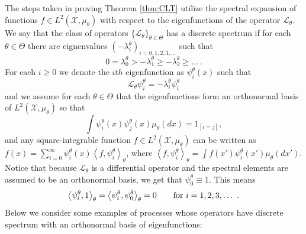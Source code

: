 \documentclass{article}
\begin{document}
The steps taken in proving Theorem \ref{thm:CLT} utilize the spectral expansion of functions $f\in L^{2}(\mathcal{X},\mu_{\theta})$ with respect to the eigenfunctions of the operator $\mathcal{L}_{\theta}$. We say that the class of operators $\{\mathcal L_\theta\}_{\theta\in\Theta}$ has a discrete spectrum if for each $\theta\in\Theta$ there are eignenvalues $(-\lambda_i^\theta)_{i=0,1,2,3,\dots}$ such that
\[0=\lambda_0^\theta>-\lambda_1^\theta\geq-\lambda_2^\theta\geq\dots\ .\]
For each $i\geq 0$ we denote the $ith$ eigenfunction as $\psi_i^\theta(x)$ such that
\[\mathcal L_\theta\psi_i^\theta = -\lambda_i^\theta\psi_i^\theta\]
and we assume for each $\theta\in\Theta$ that the eigenfunctions form an orthonormal basis of $L^2(\mathcal{X},\mu_{\theta})$ so that
\[\int \psi_i^\theta(x)\psi_j^\theta(x)\mu_\theta(dx) = 1_{[i=j]} ,\]
and any square-integrable function $f\in L^2(\mathcal{X},\mu_{\theta})$ can be written as
$f(x) = \sum_{i=0}^\infty \psi_i^\theta(x)\left<f,\psi_i^\theta\right>_\theta$, where $\left<f,\psi_i^\theta\right>_\theta = \int f(x') \psi_i^\theta(x')\mu_\theta(dx')$. Notice that because $\mathcal L_\theta$ is a differential operator and the spectral elements are assumed to be an orthonormal basis, we get that $\psi_0^\theta\equiv 1$. This means
\begin{equation}
\left<\psi_i^\theta,1\right>_\theta=\left<\psi_i^\theta, \psi_0^\theta\right>_\theta = 0\qquad\hbox{for }i=1,2,3,\dots\ .\label{Eq:OrthonormalBasis}
\end{equation}
Below we consider some examples of processes whose operators have discrete spectrum with an orthonormal basis of eigenfunctions:
\end{document}
